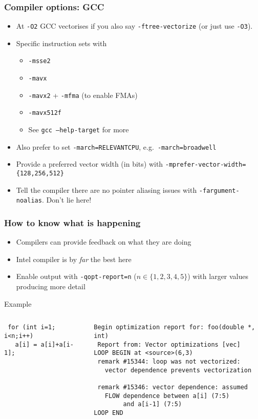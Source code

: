 \documentclass[presentation,aspectratio=43,10pt]{beamer}
\begin{document}
\begin{frame}
  \frametitle{Compiler options: GCC}
  \begin{itemize}
  \item At \texttt{-O2} GCC vectorises if you also say
    \texttt{-ftree-vectorize} (or just use \texttt{-O3}).
  \item Specific instruction sets with
    \begin{itemize}
    \item \texttt{-msse2}
    \item \texttt{-mavx}

    \item \texttt{-mavx2} + \texttt{-mfma} (to enable FMAs)
    \item \texttt{-mavx512f}
    \item See \texttt{gcc --help-target} for more
    \end{itemize}
  \item Also prefer to set \texttt{-march=RELEVANTCPU},
    e.g.~\texttt{-march=broadwell}
  \item Provide a preferred vector width (in bits) with
    \texttt{-mprefer-vector-width=\{128,256,512\}}
  \item Tell the compiler there are no pointer aliasing issues with
    \texttt{-fargument-noalias}. Don't lie here!
  \end{itemize}
\end{frame}

\begin{frame}[fragile]
  \frametitle{How to know what is happening}
  \begin{itemize}
  \item Compilers can provide feedback on what they are doing
  \item Intel compiler is by \emph{far} the best here
  \item Enable output with \texttt{-qopt-report=n} ($n \in \{1, 2, 3,
    4, 5\}$) with larger values producing more detail
  \end{itemize}
\begin{exampleblock}{Example}
  \begin{columns}
    \begin{column}{0.3\textwidth}
\begin{verbatim}
 for (int i=1; i<n;i++)
   a[i] = a[i]+a[i-1];
\end{verbatim}
    \end{column}
    \begin{column}{0.6\textwidth}
\begin{verbatim}
Begin optimization report for: foo(double *, int)
 Report from: Vector optimizations [vec]
LOOP BEGIN at <source>(6,3)
 remark #15344: loop was not vectorized:
   vector dependence prevents vectorization

 remark #15346: vector dependence: assumed
   FLOW dependence between a[i] (7:5)
        and a[i-1] (7:5)
LOOP END
\end{verbatim}
    \end{column}
  \end{columns}
\end{exampleblock}
\end{frame}
\end{document}
